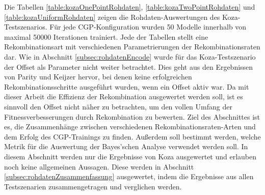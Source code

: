 Die Tabellen \ref{table:kozaOnePointRohdaten}, \ref{table:kozaTwoPointRohdaten} und \ref{table:kozaUniformRohdaten} zeigen die Rohdaten-Auswertungen des Koza-Testszenarios.
Für jede CGP-Konfiguration wurden 50 Modelle innerhalb von maximal 50000 Iterationen trainiert.
Jede der Tabellen stellt eine Rekombinationsart mit verschiedenen Parametrierungen der Rekombinationsraten dar.
Wie in Abschnitt \ref{subsec:rohdatenEncode} wurde für das Koza-Testszenario der Offset als Parameter nicht weiter betrachtet.
Dies geht aus den Ergebnissen von Parity und Keijzer hervor, bei denen keine erfolgreichen Rekombinationsschritte ausgeführt wurden, wenn ein Offset aktiv war.
Da mit dieser Arbeit die Effizienz der Rekombination ausgewertet werden soll, ist es sinnvoll den Offset nicht näher zu betrachten, um den vollen Umfang der Fitnessverbesserungen durch Rekombination zu bewerten.
Ziel des Abschnittes ist es, die Zusammenhänge zwischen verschiedenen Rekombinationsraten-Arten und dem Erfolg des CGP-Trainings zu finden.
Außerdem soll bestimmt werden, welche Metrik für die Auswertung der Bayes'schen Analyse verwendet werden soll.
In diesem Abschnitt werden nur die Ergebnisse von Koza ausgewertet und erlauben noch keine allgemeinen Aussagen.
Diese werden in Abschnitt \ref{subsec:rohdatenZusammenfassung} ausgewertet, indem die Ergebnisse aus allen Testszenarien zusammengetragen und verglichen werden.

